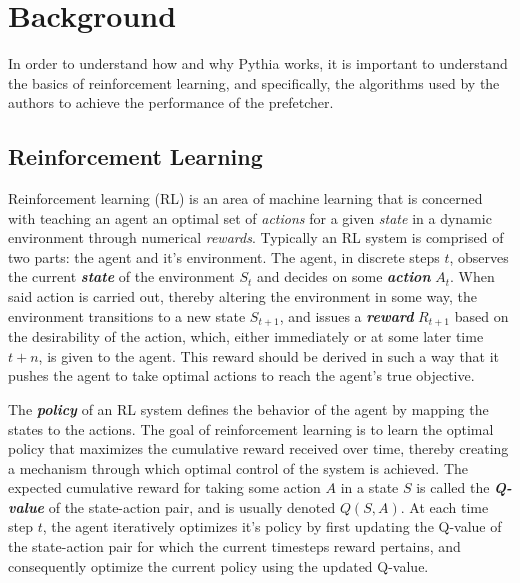 \section{Background}
In order to understand how and why Pythia works, it is important to understand the basics
of reinforcement learning, and specifically, the algorithms used by the authors to achieve the 
performance of the prefetcher.

\subsection{Reinforcement Learning}
Reinforcement learning (RL) \cite{reinforcement_learning} is an area of machine learning 
that is concerned with teaching an agent an optimal set of \textit{actions} for a given 
\textit{state} in a dynamic environment through numerical \textit{rewards}. Typically 
an RL system is comprised of two parts: the agent and it's environment. The agent, 
in discrete steps $t$, observes the current \textbf{\textit{state}} of the environment 
$S_{t}$ and decides on some \textbf{\textit{action}} $A_t$. When said action is carried 
out, thereby altering the environment in some way, the environment transitions to a new 
state $S_{t+1}$, and issues a \textbf{\textit{reward}} $R_{t+1}$ based on the desirability 
of the action, which, either immediately or at some later time $t + n$, is given to the agent. 
This reward should be derived in such a way that it pushes the agent to take optimal actions
to reach the agent's true objective.

The \textbf{\textit{policy}} of an RL system defines the behavior of the agent by mapping the 
states to the actions. The goal of reinforcement learning is to learn the optimal policy that 
maximizes the cumulative reward received over time, thereby creating a mechanism through which
optimal control of the system is achieved. The expected cumulative reward for taking some action
$A$ in a state $S$ is called the \textbf{\textit{Q-value}} of the state-action pair, and is
usually denoted $Q(S, A)$. At each time step $t$, the agent iteratively optimizes it's policy
by first updating the Q-value of the state-action pair for which the current timesteps reward
pertains, and consequently optimize the current policy using the updated Q-value.

